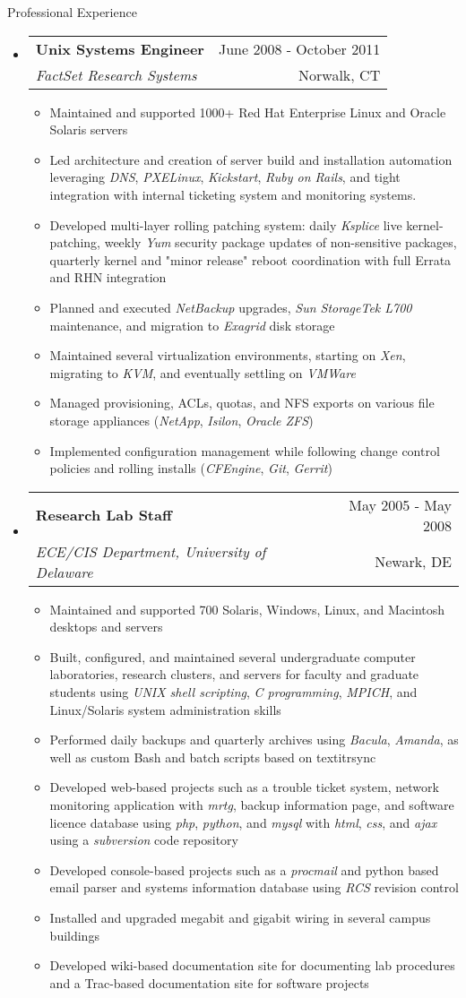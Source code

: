 \documentclass[letterpaper,10pt]{article}
\makeatletter
\newenvironment{ressection}[1]{
	\vspace{4pt}
	{\fontfamily{phv}\selectfont\Large#1}
	\begin{itemize}
	\vspace{3pt}
}{
	\end{itemize}
}
\newcommand{\ressubitem}[1]{
	\vspace{-1pt}
	\item \begin{flushleft} #1 \end{flushleft}
}
\newcommand{\resbigitem}[4]{
	\vspace{-5pt}
	\item
	\begin{tabular*}{6in}{l@{\extracolsep{\fill}}r}
		\textbf{#1} & #2 \\
		\textit{#3} & #4\\
	\end{tabular*}
}
\newenvironment{ressubsec}[4]{
	\resbigitem{#1}{#2}{#3}{#4}
	\vspace{-2pt}
	\begin{itemize}
}{
	\end{itemize}
}
\makeatother
\begin{document}
\begin{ressection}{Professional Experience}
	\begin{ressubsec}{Unix Systems Engineer}{June 2008 - October 2011}{FactSet Research Systems}{Norwalk, CT}
		\ressubitem{Maintained and supported 1000+ Red Hat Enterprise Linux and Oracle Solaris servers}
		\ressubitem{Led architecture and creation of server build and installation automation leveraging \textit{DNS}, \textit{PXELinux}, \textit{Kickstart}, \textit{Ruby on Rails}, and tight integration with internal ticketing system and monitoring systems.}
		\ressubitem{Developed multi-layer rolling patching system: daily \textit{Ksplice} live kernel-patching, weekly \textit{Yum} security package updates of non-sensitive packages, quarterly kernel and "minor release" reboot coordination with full Errata and RHN integration}
		\ressubitem{Planned and executed \textit{NetBackup} upgrades, \textit{Sun StorageTek L700} maintenance, and migration to \textit{Exagrid} disk storage}
		\ressubitem{Maintained several virtualization environments, starting on \textit{Xen}, migrating to \textit{KVM}, and eventually settling on \textit{VMWare}}
		\ressubitem{Managed provisioning, ACLs, quotas, and NFS exports on various file storage appliances (\textit{NetApp}, \textit{Isilon}, \textit{Oracle ZFS})}
		\ressubitem{Implemented configuration management while following change control policies and rolling installs (\textit{CFEngine}, \textit{Git}, \textit{Gerrit})}
	\end{ressubsec}

\pagebreak

	\begin{ressubsec}{Research Lab Staff}{May 2005 - May 2008}{ECE/CIS Department, University of Delaware}{Newark, DE}
		\ressubitem{Maintained and supported 700 Solaris, Windows, Linux, and Macintosh desktops and servers}
		\ressubitem{Built, configured, and maintained several undergraduate computer laboratories, research clusters, and servers for faculty and graduate students using \textit{UNIX shell scripting}, \textit{C programming}, \textit{MPICH}, and Linux/Solaris system administration skills}
		\ressubitem{Performed daily backups and quarterly archives using \textit{Bacula}, \textit{Amanda}, as well as custom Bash and batch scripts based on textit{rsync}}
		\ressubitem{Developed web-based projects such as a trouble ticket system, network monitoring application with \textit{mrtg}, backup information page, and software licence database using \textit{php}, \textit{python}, and \textit{mysql} with \textit{html}, \textit{css}, and \textit{ajax} using a \textit{subversion} code repository}
		\ressubitem{Developed console-based projects such as a \textit{procmail} and python based email parser and systems information database using \textit{RCS} revision control}
		\ressubitem{Installed and upgraded megabit and gigabit wiring in several campus buildings}
		\ressubitem{Developed wiki-based documentation site for documenting lab procedures and a Trac-based documentation site for software projects}
	\end{ressubsec}


\end{ressection}
\end{document}
